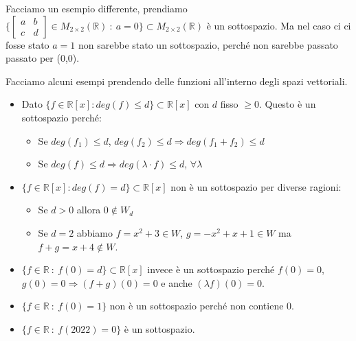 \begin{example}
Facciamo un esempio differente, prendiamo $\Bigg\{\begin{bmatrix}a & b \\ c & d\end{bmatrix} \in M_{2\times 2}(\mathbb{R})\: :\: a= 0 \Bigg\}\subset M_{2 \times 2}(\mathbb{R})$ è un sottospazio. Ma nel caso ci ci fosse stato $a=1$ non sarebbe stato un sottospazio, perché non sarebbe passato passato per (0,0).
\end{example}

\begin{example}
Facciamo alcuni esempi prendendo delle funzioni all'interno degli spazi vettoriali.
\begin{itemize}
    \item Dato $\{f \in \mathbb{R}[x] : deg(f) \leq d\} \subset \mathbb{R}[x]$ con $d$ fisso $\geq 0$. Questo è un sottospazio perché:
    \begin{itemize}
    	\item Se $deg(f_1) \leq d$, $deg(f_2) \leq d \Longrightarrow deg(f_1 + f_2) \leq d$
    	\item  Se $deg(f) \leq d \Longrightarrow deg(\lambda \cdot f) \leq d$, $\forall \lambda$
    \end{itemize}
    \item $\{f \in \mathbb{R}[x] : deg(f) = d\} \subset \mathbb{R}[x]$ non è un sottospazio per diverse ragioni:
    \begin{itemize}
    	\item Se $d>0$ allora $0 \notin W_d$
    	\item Se $d=2$ abbiamo $f = x^2 + 3 \in W$, $g = -x^2 + x + 1 \in W$ ma $f + g = x + 4 \notin W$.
    \end{itemize}
    \item $\{f \in \mathbb{R} \: : \: f(0) = d\} \subset \mathbb{R}[x]$ invece è un sottospazio perché $f(0) = 0$, $g(0)=0 \Longrightarrow (f + g)(0) = 0$ e anche $(\lambda f)(0) = 0$.
    \item $\{f \in \mathbb{R} \: : \: f(0) = 1\}$ non è un sottospazio perché non contiene 0.
    \item $\{f \in \mathbb{R} \: : \: f(2022) = 0\}$ è un sottospazio.
\end{itemize}
\end{example}

